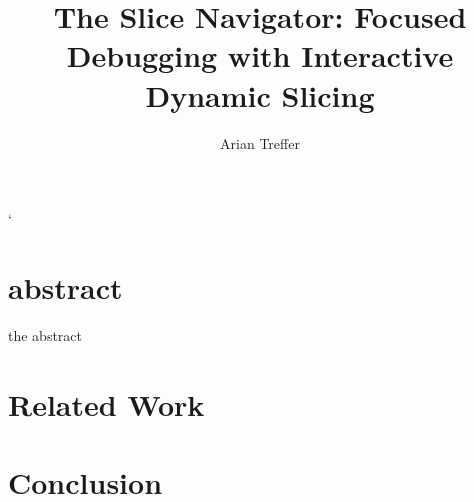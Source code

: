 \documentclass[
			english,
			phd,
			draft,
			lmodern,
			]{sty/swathesis}
\begin{document}
\lstMakeShortInline[basicstyle=\ttfamily,language={Inline}]`

\title{The Slice Navigator: Focused Debugging with Interactive Dynamic Slicing}

\author{Arian Treffer}

\maketitle


\linenumbers

\chapter*{abstract}
the abstract










\chapter{Related Work}

\chapter{Conclusion}


\nocite{*}
\printbibliography[]
\end{document}
